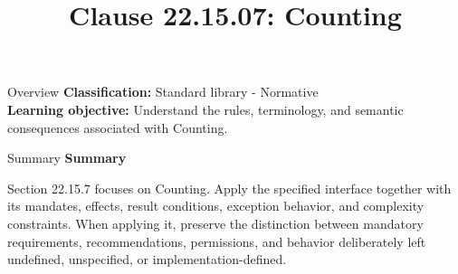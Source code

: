 \documentclass[10pt,letterpaper]{article}
\title{Clause 22.15.07: Counting}
\author{}
\date{}
\begin{document}
\maketitle
\begin{CornellOverviewBox}{Overview}
\textbf{Classification:} Standard library - Normative\\[2pt]
\textbf{Learning objective:} Understand the rules, terminology, and semantic consequences associated with Counting.
\end{CornellOverviewBox}\begin{CornellSummaryBox}{Summary}
{\sffamily\bfseries\color{Accent} Summary}\par\vspace{3pt}Section 22.15.7 focuses on Counting. Apply the specified interface together with its mandates, effects, result conditions, exception behavior, and complexity constraints. When applying it, preserve the distinction between mandatory requirements, recommendations, permissions, and behavior deliberately left undefined, unspecified, or implementation-defined.
\end{CornellSummaryBox}
\end{document}
